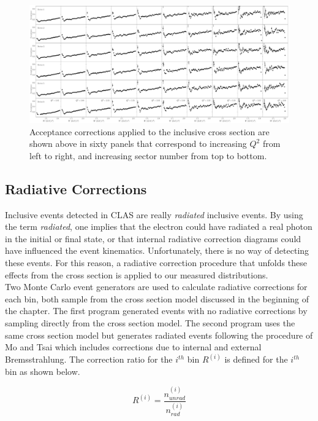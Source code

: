 \begin{figure}
	\centering
	\label{fig-acceptance-grid} 
	\includegraphics[width=\textwidth]{image/plots/inclusive/acceptance_grid.pdf}
	\caption{Acceptance corrections applied to the inclusive cross section are shown above in sixty panels that correspond to increasing $Q^2$ from left to right, and increasing sector number from top to bottom.  }
\end{figure}

\subsection{Radiative Corrections}

Inclusive events detected in CLAS are really \textit{radiated} inclusive events.  By using the term \textit{radiated}, one implies that the electron could have radiated a real photon in the initial or final state, or that internal radiative correction diagrams could have influenced the event kinematics.  Unfortunately, there is no way of detecting these events.  For this reason, a radiative correction procedure that unfolds these effects from the cross section is applied to our measured distributions.  \\

Two Monte Carlo event generators are used to calculate radiative corrections for each bin, both sample from the cross section model discussed in the beginning of the chapter.  The first program generated events with no radiative corrections by sampling directly from the cross section model.  The second program uses the same cross section model but generates radiated events following the procedure of Mo and Tsai \cite{misc-mo:1969} which includes corrections due to internal and external Bremsstrahlung.  The correction ratio for the $i^{th}$ bin $R^{(i)}$ is defined for the $i^{th}$ bin as shown below. 

\begin{equation}
  R^{(i)} = \frac{n_{unrad}^{(i)}}{n_{rad}^{(i)}}
\end{equation}

